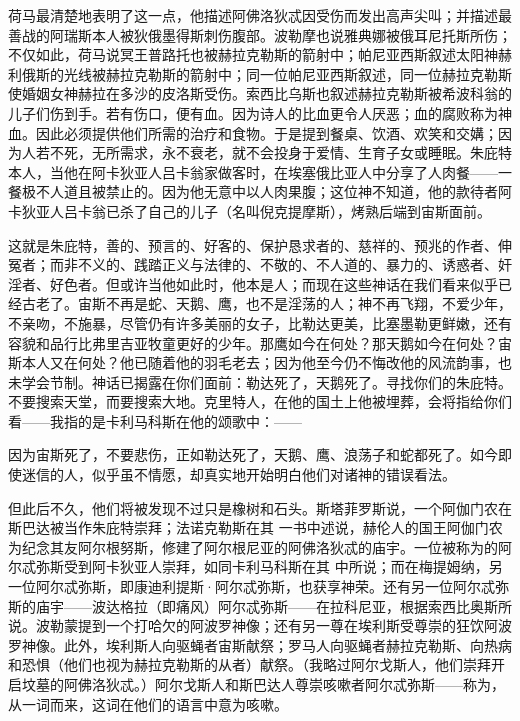 荷马最清楚地表明了这一点，他描述阿佛洛狄忒因受伤而发出高声尖叫；并描述最善战的阿瑞斯本人被狄俄墨得斯刺伤腹部。波勒摩也说雅典娜被俄耳尼托斯所伤；不仅如此，荷马说冥王普路托也被赫拉克勒斯的箭射中；帕尼亚西斯叙述太阳神赫利俄斯的光线被赫拉克勒斯的箭射中；同一位帕尼亚西斯叙述，同一位赫拉克勒斯使婚姻女神赫拉在多沙的皮洛斯受伤。索西比乌斯也叙述赫拉克勒斯被希波科翁的儿子们伤到手。若有伤口，便有血。因为诗人的比血更令人厌恶；血的腐败称为神血。因此必须提供他们所需的治疗和食物。于是提到餐桌、饮酒、欢笑和交媾；因为人若不死，无所需求，永不衰老，就不会投身于爱情、生育子女或睡眠。朱庇特本人，当他在阿卡狄亚人吕卡翁家做客时，在埃塞俄比亚人中分享了人肉餐——一餐极不人道且被禁止的。因为他无意中以人肉果腹；这位神不知道，他的款待者阿卡狄亚人吕卡翁已杀了自己的儿子（名叫倪克提摩斯），烤熟后端到宙斯面前。\par

这就是朱庇特，善的、预言的、好客的、保护恳求者的、慈祥的、预兆的作者、伸冤者；而非不义的、践踏正义与法律的、不敬的、不人道的、暴力的、诱惑者、奸淫者、好色者。但或许当他如此时，他本是人；而现在这些神话在我们看来似乎已经古老了。宙斯不再是蛇、天鹅、鹰，也不是淫荡的人；神不再飞翔，不爱少年，不亲吻，不施暴，尽管仍有许多美丽的女子，比勒达更美，比塞墨勒更鲜嫩，还有容貌和品行比弗里吉亚牧童更好的少年。那鹰如今在何处？那天鹅如今在何处？宙斯本人又在何处？他已随着他的羽毛老去；因为他至今仍不悔改他的风流韵事，也未学会节制。神话已揭露在你们面前：勒达死了，天鹅死了。寻找你们的朱庇特。不要搜索天堂，而要搜索大地。克里特人，在他的国土上他被埋葬，会将指给你们看——我指的是卡利马科斯在他的颂歌中：——\par

\par

因为宙斯死了，不要悲伤，正如勒达死了，天鹅、鹰、浪荡子和蛇都死了。如今即使迷信的人，似乎虽不情愿，却真实地开始明白他们对诸神的错误看法。\par

\par

但此后不久，他们将被发现不过只是橡树和石头。斯塔菲罗斯说，一个阿伽门农在斯巴达被当作朱庇特崇拜；法诺克勒斯在其  一书中述说，赫伦人的国王阿伽门农为纪念其友阿尔根努斯，修建了阿尔根尼亚的阿佛洛狄忒的庙宇。一位被称为的阿尔忒弥斯受到阿卡狄亚人崇拜，如同卡利马科斯在其  中所说；而在梅提姆纳，另一位阿尔忒弥斯，即康迪利提斯·阿尔忒弥斯，也获享神荣。还有另一位阿尔忒弥斯的庙宇——波达格拉（即痛风）阿尔忒弥斯——在拉科尼亚，根据索西比奥斯所说。波勒蒙提到一个打哈欠的阿波罗神像；还有另一尊在埃利斯受尊崇的狂饮阿波罗神像。此外，埃利斯人向驱蝇者宙斯献祭；罗马人向驱蝇者赫拉克勒斯、向热病和恐惧（他们也视为赫拉克勒斯的从者）献祭。（我略过阿尔戈斯人，他们崇拜开启坟墓的阿佛洛狄忒。）阿尔戈斯人和斯巴达人尊崇咳嗽者阿尔忒弥斯——称为，从一词而来，这词在他们的语言中意为咳嗽。\par

